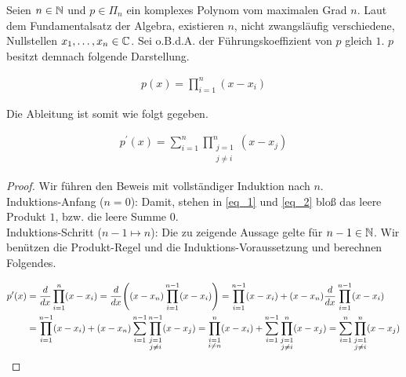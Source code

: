 \begin{theorem}

\label{th_1}

Seien $n \in \mathbb{N}$ und $p \in \Pi_n$ ein komplexes Polynom vom maximalen Grad $n$.
Laut dem Fundamentalsatz der Algebra, existieren $n$, nicht zwangsläufig verschiedene, Nullstellen $x_1, \ldots, x_n \in \mathbb{C}$.
Sei o.B.d.A. der Führungskoeffizient von $p$ gleich $1$.
$p$ besitzt demnach folgende Darstellung.

\begin{align} \label{eq_1}
  p(x)
  =
  \prod_{i=1}^n (x - x_i)
\end{align}

Die Ableitung ist somit wie folgt gegeben.

\begin{align} \label{eq_2}
  p^\prime(x)
  =
  \sum_{i=1}^n
  \prod_{\substack{j=1 \\ j \neq i}}^n
  (x - x_j)
\end{align}

\end{theorem}

\begin{proof}

Wir führen den Beweis mit vollständiger Induktion nach $n$. \\

Induktions-Anfang ($n = 0$):
Damit, stehen in \eqref{eq_1} und \eqref{eq_2} bloß das leere Produkt $1$, bzw. die leere Summe $0$. \\

Induktions-Schritt ($n-1 \mapsto n$):
Die zu zeigende Aussage gelte für $n-1 \in \mathbb{N}$.
Wir benützen die Produkt-Regel und die Induktions-Voraussetzung und berechnen Folgendes.

\begin{align*}
  p^\prime(x)
  & =
  \frac{d}{dx}
  \prod_{i=1}^{n} (x - x_i)
  =
  \frac{d}{dx}
  {\left ( 
    (x - x_n)
    \prod_{i=1}^{n-1} (x - x_i)
   \right )}
  =
  \prod_{i=1}^{n-1} (x - x_i)
  +
  (x - x_n)
  \frac{d}{dx}
  \prod_{i=1}^{n-1} (x - x_i) \\
  & =
  \prod_{i=1}^{n-1} (x - x_i)
  +
  (x - x_n)
  \sum_{i=1}^{n-1}
  \prod_{\substack{j=1 \\ j \neq i}}^{n-1} (x - x_j)
  =
  \prod_{\substack{i=1 \\ i \neq n}}^n (x - x_i)
  +
  \sum_{i=1}^{n-1}
  \prod_{\substack{j=1 \\ j \neq i}}^n (x - x_j)
  =
  \sum_{i=1}^n
  \prod_{\substack{j=1 \\ j \neq i}}^n
  (x - x_j)
\end{align*}

\end{proof}
